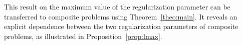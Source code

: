 \documentclass[12pt]{article}
\begin{document}


    This result on the maximum value of the regularization parameter can be transferred to composite problems using Theorem~\ref{theo:main}. It reveals an explicit dependence between the two regularization parameters of composite problems, as illustrated in Proposition~\ref{prop:lmax}.


\end{document}
